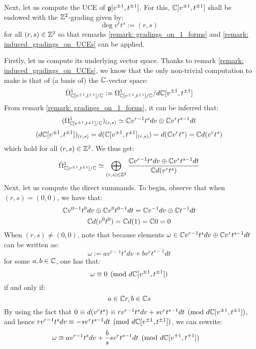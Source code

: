         \begin{example} \label{example: toroidal_lie_algebras_centres}
            Next, let us compute the UCE of $\mathfrak{g}[v^{\pm 1}, t^{\pm 1}]$. For this, $\mathbb{C}[v^{\pm 1}, t^{\pm 1}]$ shall be endowed with the $\mathbb{Z}^2$-grading given by:
                $$\deg v^r t^s := (r, s)$$
            for all $(r, s) \in \mathbb{Z}^2$ so that remarks \ref{remark: gradings_on_1_forms} and \ref{remark: induced_gradings_on_UCEs} can be applied. 
            
            Firstly, let us compute its underlying vector space. Thanks to remark \ref{remark: induced_gradings_on_UCEs}, we know that the only non-trivial computation to make is that of (a basis of) the $\bbC$-vector space:
                $$\bar{\Omega}^1_{\bbC[v^{\pm 1}, t^{\pm 1}]/\bbC} := \Omega^1_{\bbC[v^{\pm 1}, t^{\pm 1}]/\bbC}/d\bbC[v^{\pm 1}, t^{\pm 1}]$$
            From remark \ref{remark: gradings_on_1_forms}, it can be inferred that:
                $$( \Omega^1_{\bbC[v^{\pm 1}, t^{\pm 1}]/\bbC} )_{(r, s)} \cong \bbC v^{r - 1} t^s dv \oplus \bbC v^r t^{s - 1} dt$$
                $$( d\bbC[v^{\pm 1}, t^{\pm 1}] )_{(r, s)} = d( \bbC[v^{\pm 1}, t^{\pm 1}]_{(r, s)} ) = d( \bbC v^r t^s ) = \bbC d(v^r t^s)$$
            which hold for all $(r, s) \in \Z^2$. We thus get:
                $$\bar{\Omega}^1_{\bbC[v^{\pm 1}, t^{\pm 1}]/\bbC} \cong \bigoplus_{(r, s) \in \Z^2} \frac{ \bbC v^{r - 1} t^s dv \oplus \bbC v^r t^{s - 1} dt }{ \bbC d(v^r t^s) }$$
            Next, let us compute the direct summands. To begin, observe that when $(r, s) = (0, 0)$, we have that:
                $$\bbC v^{0 - 1} t^0 dv \oplus \bbC v^0 t^{0 - 1} dt = \bbC v^{-1} dv \oplus \bbC t^{-1} dt$$
                $$\bbC d(v^0 t^0) = \bbC d(1) = \bbC 0 = 0$$
            When $(r, s) \not = (0, 0)$, note that because elements $\omega \in \bbC v^{r - 1} t^s dv \oplus \bbC v^r t^{s - 1} dt$ can be written as:
                $$\omega := a v^{r - 1} t^s dv + b v^r t^{s - 1} dt$$
            for some $a, b \in \bbC$, one has that:
                $$\omega \equiv 0 \pmod{d\bbC[v^{\pm 1}, t^{\pm 1}]}$$
            if and only if:
                $$a \in \bbC r, b \in \bbC s$$
            By using the fact that $0 \equiv d(v^r t^s) \equiv r v^{r - 1} t^s dv + s v^r t^{s - 1} dt \pmod{d\bbC[v^{\pm 1}, t^{\pm 1}]}$, and hence $r v^{r - 1} t^s dv \equiv -s v^r t^{s - 1} dt \pmod{d\bbC[v^{\pm 1}, t^{\pm 1}]}$, we can rewrite:
                $$
                    \begin{aligned}
                        \omega & \equiv a v^{r - 1} t^s dv + \frac{b}{s} s v^r t^{s - 1} dt \pmod{d\bbC[v^{\pm 1}, t^{\pm 1}]}

\end{aligned}$$
\end{example}
